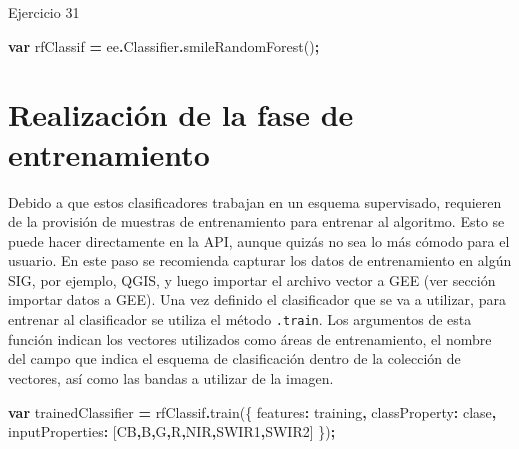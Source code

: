 \documentclass[
  12pt,
  letterpaper,
  twoside]{book}
\newenvironment{Shaded}{\begin{snugshade}}{\end{snugshade}}
\newcommand{\AttributeTok}[1]{\textcolor[rgb]{0.77,0.63,0.00}{#1}}
\newcommand{\DataTypeTok}[1]{\textcolor[rgb]{0.13,0.29,0.53}{#1}}
\newcommand{\FunctionTok}[1]{\textcolor[rgb]{0.00,0.00,0.00}{#1}}
\newcommand{\KeywordTok}[1]{\textcolor[rgb]{0.13,0.29,0.53}{\textbf{#1}}}
\newcommand{\NormalTok}[1]{#1}
\newcommand{\OperatorTok}[1]{\textcolor[rgb]{0.81,0.36,0.00}{\textbf{#1}}}
\newcommand{\StringTok}[1]{\textcolor[rgb]{0.31,0.60,0.02}{#1}}
\begin{document}
Ejercicio 31

\begin{Shaded}
\begin{Highlighting}[]
\KeywordTok{var}\NormalTok{ rfClassif }\OperatorTok{=}\NormalTok{ ee}\OperatorTok{.}\AttributeTok{Classifier}\OperatorTok{.}\FunctionTok{smileRandomForest}\NormalTok{()}\OperatorTok{;}
\end{Highlighting}
\end{Shaded}

\hypertarget{realizaciuxf3n-de-la-fase-de-entrenamiento}{%
\section{Realización de la fase de entrenamiento}\label{realizaciuxf3n-de-la-fase-de-entrenamiento}}

Debido a que estos clasificadores trabajan en un esquema supervisado, requieren de la provisión de muestras de entrenamiento para entrenar al algoritmo. Esto se puede hacer directamente en la API, aunque quizás no sea lo más cómodo para el usuario. En este paso se recomienda capturar los datos de entrenamiento en algún SIG, por ejemplo, QGIS, y luego importar el archivo vector a GEE (ver sección importar datos a GEE). Una vez definido el clasificador que se va a utilizar, para entrenar al clasificador se utiliza el método \texttt{.train}. Los argumentos de esta función indican los vectores utilizados como áreas de entrenamiento, el nombre del campo que indica el esquema de clasificación dentro de la colección de vectores, así como las bandas a utilizar de la imagen.

\begin{Shaded}
\begin{Highlighting}[]
\KeywordTok{var}\NormalTok{ trainedClassifier }\OperatorTok{=}\NormalTok{ rfClassif}\OperatorTok{.}\FunctionTok{train}\NormalTok{(\{}
  \DataTypeTok{features}\OperatorTok{:}\NormalTok{ training}\OperatorTok{,}
  \DataTypeTok{classProperty}\OperatorTok{:} \StringTok{\textquotesingle{}clase\textquotesingle{}}\OperatorTok{,}
  \DataTypeTok{inputProperties}\OperatorTok{:}\NormalTok{ [}\StringTok{\textquotesingle{}CB\textquotesingle{}}\OperatorTok{,}\StringTok{\textquotesingle{}B\textquotesingle{}}\OperatorTok{,}\StringTok{\textquotesingle{}G\textquotesingle{}}\OperatorTok{,}\StringTok{\textquotesingle{}R\textquotesingle{}}\OperatorTok{,}\StringTok{\textquotesingle{}NIR\textquotesingle{}}\OperatorTok{,}\StringTok{\textquotesingle{}SWIR1\textquotesingle{}}\OperatorTok{,}\StringTok{\textquotesingle{}SWIR2\textquotesingle{}}\NormalTok{]}
\NormalTok{\})}\OperatorTok{;}
\end{Highlighting}
\end{Shaded}
\end{document}
